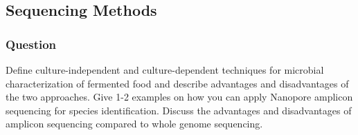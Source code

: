 \subsection{Sequencing Methods}
\subsubsection*{Question}
Define culture-independent and culture-dependent techniques for microbial characterization of fermented food and describe advantages and disadvantages of the two approaches. Give 1-2 examples on how you can apply Nanopore amplicon sequencing for species identification. Discuss the advantages and disadvantages of amplicon sequencing compared to whole genome sequencing. 

